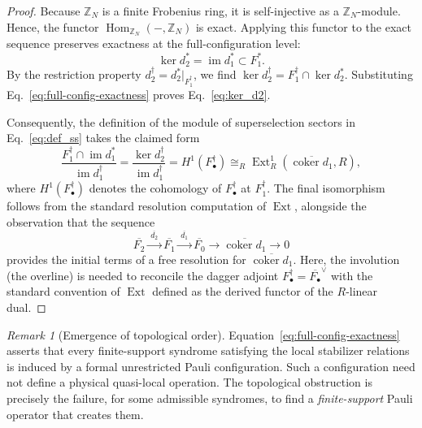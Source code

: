 \documentclass[aps,prx,english,superscriptaddress,twocolumn,tightenlines,showpacs,longbibliography,floatfix,amsfonts]{revtex4-2}
\theoremstyle{remark}
\newtheorem{remark}{Remark}
\theoremstyle{definition}
\begin{document}
\begin{proof}
	Because $\mathbb{Z}_N$ is a finite Frobenius ring, it is self-injective as a $\mathbb{Z}_N$-module. Hence, the functor $\operatorname{Hom}_{\mathbb{Z}_N}(-,\mathbb{Z}_N)$ is exact. Applying this functor to the exact sequence preserves exactness at the full-configuration level:
	\begin{equation}
		\ker d_2^* = \operatorname{im} d_1^* \subset F_1^*.
		\label{eq:full-config-exactness}
	\end{equation}
	By the restriction property $d_2^\dagger = d_2^*|_{F_1^\dagger}$, we find $\ker d_2^\dagger = F_1^\dagger \cap \ker d_2^*$. Substituting Eq.~\eqref{eq:full-config-exactness} proves Eq.~\eqref{eq:ker_d2}.

	Consequently, the definition of the module of superselection sectors in Eq.~\eqref{eq:def_ss} takes the claimed form
	\begin{equation}
		\frac{F_1^\dagger\cap \operatorname{im} d_1^*}{\operatorname{im} d_1^\dagger} =
		\frac{\ker d_2^\dagger}{\operatorname{im} d_1^\dagger} =
			H^1(F_\bullet^\dagger) \cong_R \operatorname{Ext}_R^1(\overline{\operatorname{coker}d_1},R),
		\label{eq:SS_dd}
	\end{equation}
	where $H^1(F_\bullet^\dagger)$ denotes the cohomology of $F_\bullet^\dagger$ at $F_1^\dagger$.
	The final isomorphism follows from the standard resolution computation of $\operatorname{Ext}$, alongside the observation that the sequence
	\begin{equation}
			\overline{F_2}\xrightarrow{\;\overline{d_2}\;}\overline{F_1}\xrightarrow{\;\overline{d_1}\;}\overline{F_0}\rightarrow \overline{\operatorname{coker}d_1} \rightarrow 0
		\end{equation}
		provides the initial terms of a free resolution for $\overline{\operatorname{coker}d_1}$. Here, the involution (the overline) is needed to reconcile the dagger adjoint $F_\bullet^\dagger = \overline{F_\bullet}^\vee$ with the standard convention of $\operatorname{Ext}$ defined as the derived functor of the $R$-linear dual.
\end{proof}

\begin{remark}[Emergence of topological order]
	Equation~\eqref{eq:full-config-exactness} asserts that every finite-support
	syndrome satisfying the local stabilizer relations is induced by a formal
	unrestricted Pauli configuration. Such a configuration need not define a
	physical quasi-local operation. The topological obstruction is precisely the
	failure, for some admissible syndromes, to find a \emph{finite-support} Pauli
	operator that creates them.
\end{remark}
\end{document}
